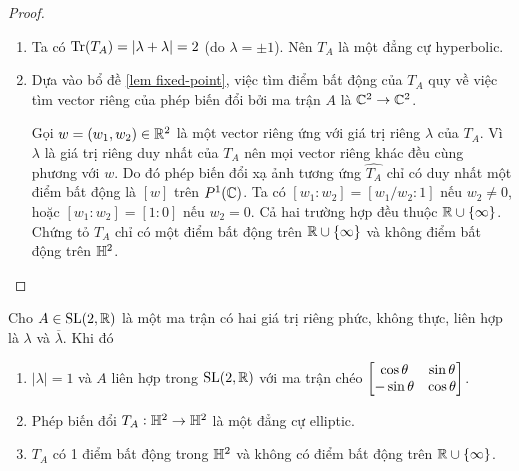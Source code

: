 \begin{proof}
\begin{enumerate}
        \item Ta có $\operatorname{Tr}(T_A)= |\lambda + \lambda| = 2$ (do $\lambda = \pm 1$). Nên $T_A$ là một đẳng cự hyperbolic.

        
        \item Dựa vào bổ đề \ref{lem fixed-point}, việc tìm điểm bất động của $T_A$ quy về việc tìm vector riêng của phép biến đổi bởi ma trận $A$ là $\mathbb{C}^2\to \mathbb{C}^2$.
        
        Gọi $w = (w_1,w_2) \in \mathbb{R}^2$ là một vector riêng ứng với giá trị riêng $\lambda$ của $T_A$. Vì $\lambda$ là giá trị riêng duy nhất của $T_A$ nên mọi vector riêng khác đều cùng phương với $w$.
        Do đó phép biến đổi xạ ảnh tương ứng $\widehat{T_A}$ chỉ có duy nhất một điểm bất động là $[w]$ trên $P^1(\mathbb{C})$. Ta có $[w_1:w_2] = [w_1/w_2:1]$ nếu $w_2\neq 0$, hoặc $[w_1:w_2] = [1:0]$ nếu $w_2 =0$. Cả hai trường hợp đều thuộc $\mathbb{R} \cup \{\infty\}$. Chứng tỏ $T_A$ chỉ có một điểm bất động trên $\mathbb{R} \cup \{\infty\}$ và không điểm bất động trên $\mathbb{H}^2$.
     \end{enumerate}
\end{proof}
\begin{prop}\label{prop 3.1.9}
    Cho $A \in \operatorname{SL}(2,\mathbb{R})$ là một ma trận có hai giá trị riêng phức, không thực, liên hợp là $\lambda$ và $\overline{\lambda}$. Khi đó
    \begin{enumerate}
        \item $|\lambda|  = 1$ và $A$ liên hợp trong $\operatorname{SL}(2,\mathbb{R})$ với ma trận chéo $\begin{bmatrix} \cos{\theta} & \sin{\theta}\\ -\sin{\theta} & \cos{\theta} \end{bmatrix}$.
        \item Phép biến đổi $T_A: \mathbb{H}^2 \to \mathbb{H}^2$ là một đẳng cự elliptic.
        \item $T_A$ có 1 điểm bất động trong $\mathbb{H}^2$ và không có điểm bất động trên $\mathbb{R} \cup \{\infty\}$.
    \end{enumerate}
\end{prop}

